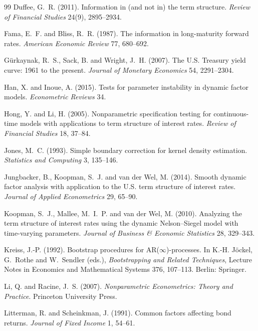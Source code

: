 \documentclass[11pt]{article}
\begin{document}
\begin{thebibliography}{99}
Duffee, G.~R. (2011). Information in (and not in) the term structure. \emph{Review of Financial Studies} 24(9), 2895--2934.

Fama, E.~F. and Bliss, R.~R. (1987). The information in long-maturity forward rates. \emph{American Economic Review} 77, 680--692.

G\"urkaynak, R.~S., Sack, B. and Wright, J.~H. (2007). The U.S. Treasury yield curve: 1961 to the present. \emph{Journal of Monetary Economics} 54, 2291--2304.

Han, X. and Inoue, A. (2015). Tests for parameter instability in dynamic factor models. \emph{Econometric Reviews} 34.

Hong, Y. and Li, H. (2005). Nonparametric specification testing for continuous-time models with applications to term structure of interest rates. \emph{Review of Financial Studies} 18, 37--84.

Jones, M.~C. (1993). Simple boundary correction for kernel density estimation. \emph{Statistics and Computing} 3, 135--146.

Jungbacker, B., Koopman, S.~J. and van der Wel, M. (2014). Smooth dynamic factor analysis with application to the U.S. term structure of interest rates. \emph{Journal of Applied Econometrics} 29, 65--90.

Koopman, S.~J., Mallee, M.~I.~P. and van der Wel, M. (2010). Analyzing the term structure of interest rates using the dynamic Nelson--Siegel model with time-varying parameters. \emph{Journal of Business \& Economic Statistics} 28, 329--343.

Kreiss, J.-P. (1992). Bootstrap procedures for AR($\infty$)-processes. In K.-H. J\"ockel, G.~Rothe and W.~Sendler (eds.), \emph{Bootstrapping and Related Techniques}, Lecture Notes in Economics and Mathematical Systems 376, 107--113. Berlin: Springer.

Li, Q. and Racine, J.~S. (2007). \emph{Nonparametric Econometrics: Theory and Practice}. Princeton University Press.

Litterman, R. and Scheinkman, J. (1991). Common factors affecting bond returns. \emph{Journal of Fixed Income} 1, 54--61.


\end{thebibliography}
\end{document}

